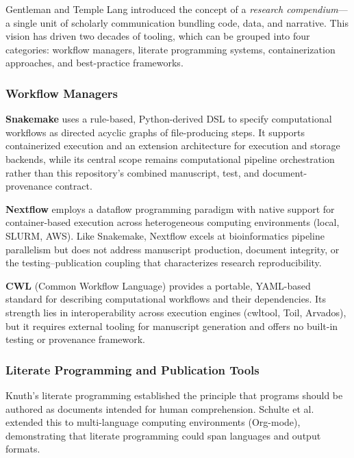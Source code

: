 \documentclass[
  english,
]{article}
\begin{document}
Gentleman and Temple Lang \citep{gentleman2007research} introduced the
concept of a \emph{research compendium}---a single unit of scholarly
communication bundling code, data, and narrative. This vision has driven
two decades of tooling, which can be grouped into four categories:
workflow managers, literate programming systems, containerization
approaches, and best-practice frameworks.

\subsubsection{Workflow Managers}\label{workflow-managers}

\textbf{Snakemake} \citep{koster2012snakemake} uses a rule-based,
Python-derived DSL to specify computational workflows as directed
acyclic graphs of file-producing steps. It supports containerized
execution and an extension architecture for execution and storage
backends, while its central scope remains computational pipeline
orchestration rather than this repository's combined manuscript, test,
and document-provenance contract.

\textbf{Nextflow} \citep{ditommaso2017nextflow} employs a dataflow
programming paradigm with native support for container-based execution
across heterogeneous computing environments (local, SLURM, AWS). Like
Snakemake, Nextflow excels at bioinformatics pipeline parallelism but
does not address manuscript production, document integrity, or the
testing--publication coupling that characterizes research
reproducibility.

\textbf{CWL} (Common Workflow Language) \citep{amstutz2016cwl} provides
a portable, YAML-based standard for describing computational workflows
and their dependencies. Its strength lies in interoperability across
execution engines (cwltool, Toil, Arvados), but it requires external
tooling for manuscript generation and offers no built-in testing or
provenance framework.

\subsubsection{Literate Programming and Publication
Tools}\label{literate-programming-and-publication-tools}

Knuth's literate programming \citep{knuth1984literate} established the
principle that programs should be authored as documents intended for
human comprehension. Schulte et al. \citep{schulte2012multilanguage}
extended this to multi-language computing environments (Org-mode),
demonstrating that literate programming could span languages and output
formats.
\end{document}
